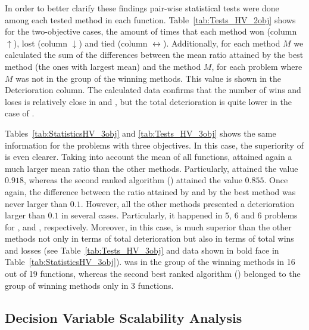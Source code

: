 


In order to better clarify these findings pair-wise statistical tests were done among each tested method in each
function.
%
Table~\ref{tab:Tests_HV_2obj} shows for the two-objective cases, the amount of times that each method won (column $\uparrow$),
lost (column $\downarrow$) and tied (column $\leftrightarrow$).
%
Additionally, for each method $M$ we calculated the sum of the differences between the mean \HV{} ratio attained by the best method 
(the ones with largest mean) and the method $M$, for each problem where $M$ was not in the group of the winning methods.
%
This value is shown in the Deterioration column.
%
The calculated data confirms that the number of wins and loses is relatively close in \VSDMOEA{} and \RMOEA{}, 
but the total deterioration is quite lower in the case of \VSDMOEA{}.


Tables~\ref{tab:StatisticsHV_3obj} and \ref{tab:Tests_HV_3obj} shows the same information for the problems with three objectives.
%
In this case, the superiority of \VSDMOEA{} is even clearer.
%
Taking into account the mean of all functions, \VSDMOEA{} attained again a much larger mean \HV{} ratio than the other methods.
%
Particularly, \VSDMOEA{} attained the value $0.918$, whereas the second ranked algorithm (\RMOEA{}) attained the value $0.855$.
%
Once again, the difference between the \HV{} ratio attained by \VSDMOEA{} and by the best method was never larger
than $0.1$.
%
However, all the other methods presented a deterioration larger than $0.1$ in several cases.
%
Particularly, it happened in $5$, $6$ and $6$ problems for \RMOEA{}, \NSGAII{} and \MOEAD{}, respectively.
%
Moreover, in this case, \VSDMOEA{} is much superior than the other methods not only in terms of total deterioration but also
in terms of total wins and losses  (see Table~\ref{tab:Tests_HV_3obj} and data shown in bold face in Table~\ref{tab:StatisticsHV_3obj}).
%
\VSDMOEA{} was in the group of the winning methods in 16 out of 19 functions, whereas the second best ranked algorithm (\RMOEA{})
belonged to the group of winning methods only in 3 functions.

\subsection{Decision Variable Scalability Analysis}


